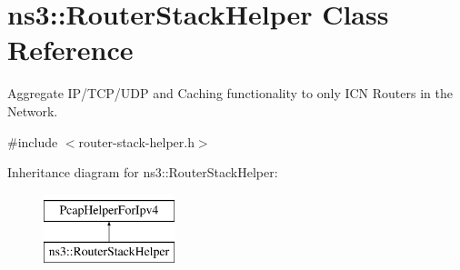 \hypertarget{classns3_1_1RouterStackHelper}{\section{ns3\-:\-:Router\-Stack\-Helper Class Reference}
\label{classns3_1_1RouterStackHelper}
}


Aggregate I\-P/\-T\-C\-P/\-U\-D\-P and Caching functionality to only I\-C\-N Routers in the Network.  




{\ttfamily \#include $<$router-\/stack-\/helper.\-h$>$}

Inheritance diagram for ns3\-:\-:Router\-Stack\-Helper\-:\begin{figure}[H]
\begin{center}
\leavevmode
\includegraphics[height=2.000000cm]{classns3_1_1RouterStackHelper}
\end{center}
\end{figure}
